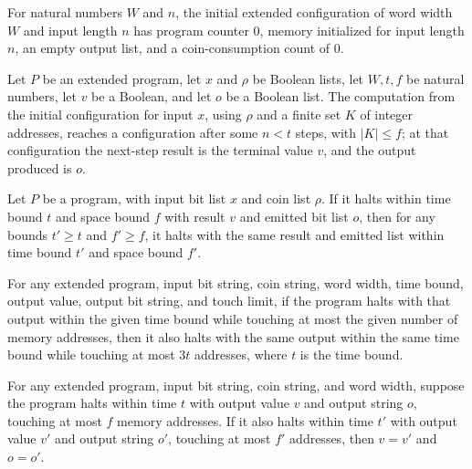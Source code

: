 \begin{definition}
\label{WordRAM.XCfg.init}
\leanok
{}
For natural numbers $W$ and $n$, the initial extended configuration of word width $W$
and input length $n$ has program counter $0$, memory initialized for input length $n$,
an empty output list, and a coin-consumption count of $0$.
\end{definition}

\begin{definition}
\label{WordRAM.HaltsWithin}
\leanok
{}
Let $P$ be an extended program, let $x$ and $\rho$ be Boolean lists, let $W,t,f$ be
natural numbers, let $v$ be a Boolean, and let $o$ be a Boolean list. The computation
from the initial configuration for input $x$, using $\rho$ and a finite set $K$ of
integer addresses, reaches a configuration after some $n<t$ steps, with $|K|\le f$; at
that configuration the next-step result is the terminal value $v$, and the output
produced is $o$.
\end{definition}

\begin{theorem}
\label{WordRAM.HaltsWithin.mono}
\leanok
{}
Let $P$ be a program, with input bit list $x$ and coin list $\rho$. If it halts within
time bound $t$ and space bound $f$ with result $v$ and emitted bit list $o$, then for
any bounds $t'\ge t$ and $f'\ge f$, it halts with the same result and emitted list
within time bound $t'$ and space bound $f'$.
\end{theorem}

\begin{theorem}
\label{WordRAM.HaltsWithin.touches_le}
\leanok
{}
For any extended program, input bit string, coin string, word width, time bound, output
value, output bit string, and touch limit, if the program halts with that output within
the given time bound while touching at most the given number of memory addresses, then
it also halts with the same output within the same time bound while touching at most
$3t$ addresses, where $t$ is the time bound.
\end{theorem}

\begin{theorem}
\label{WordRAM.HaltsWithin.unique}
\leanok
{}
For any extended program, input bit string, coin string, and word width, suppose the
program halts within time $t$ with output value $v$ and output string $o$, touching at
most $f$ memory addresses. If it also halts within time $t'$ with output value $v'$ and
output string $o'$, touching at most $f'$ addresses, then $v=v'$ and $o=o'$.
\end{theorem}

